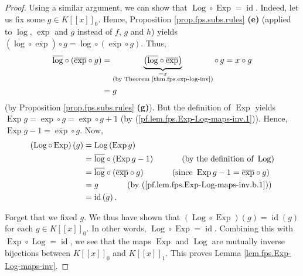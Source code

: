 \begin{proof}
Using a similar argument, we can show that $\operatorname*{Log}\circ
\operatorname*{Exp}=\operatorname*{id}$. Indeed, let us fix some $g\in
K\left[  \left[  x\right]  \right]  _{0}$. Hence, Proposition
\ref{prop.fps.subs.rules} \textbf{(e)} (applied to $\overline{\log}$,
$\overline{\exp}$ and $g$ instead of $f$, $g$ and $h$) yields $\left(
\overline{\log}\circ\overline{\exp}\right)  \circ g=\overline{\log}%
\circ\left(  \overline{\exp}\circ g\right)  $. Thus,%
\begin{align}
\overline{\log}\circ\left(  \overline{\exp}\circ g\right)   &
=\underbrace{\left(  \overline{\log}\circ\overline{\exp}\right)
}_{\substack{=x\\\text{(by Theorem \ref{thm.fps.exp-log-inv})}}}\circ
\,g=x\circ g\nonumber\\
&  =g \label{pf.lem.fps.Exp-Log-maps-inv.b.1}%
\end{align}
(by Proposition \ref{prop.fps.subs.rules} \textbf{(g)}). But the definition of
$\operatorname*{Exp}$ yields $\operatorname*{Exp}g=\exp\circ g=\overline{\exp
}\circ g+1$ (by (\ref{pf.lem.fps.Exp-Log-maps-inv.1})). Hence,
$\operatorname*{Exp}g-1=\overline{\exp}\circ g$. Now,%
\begin{align*}
\left(  \operatorname*{Log}\circ\operatorname*{Exp}\right)  \left(  g\right)
&  =\operatorname*{Log}\left(  \operatorname*{Exp}g\right) \\
&  =\overline{\log}\circ\left(  \operatorname*{Exp}g-1\right)
\ \ \ \ \ \ \ \ \ \ \left(  \text{by the definition of }\operatorname*{Log}%
\right) \\
&  =\overline{\log}\circ\left(  \overline{\exp}\circ g\right)
\ \ \ \ \ \ \ \ \ \ \left(  \text{since }\operatorname*{Exp}g-1=\overline
{\exp}\circ g\right) \\
&  =g\ \ \ \ \ \ \ \ \ \ \left(  \text{by
(\ref{pf.lem.fps.Exp-Log-maps-inv.b.1})}\right) \\
&  =\operatorname*{id}\left(  g\right)  .
\end{align*}


Forget that we fixed $g$. We thus have shown that $\left(  \operatorname*{Log}%
\circ\operatorname*{Exp}\right)  \left(  g\right)  =\operatorname*{id}\left(
g\right)  $ for each $g\in K\left[  \left[  x\right]  \right]  _{0}$. In other
words, $\operatorname*{Log}\circ\operatorname*{Exp}=\operatorname*{id}$.
Combining this with $\operatorname*{Exp}\circ\operatorname*{Log}%
=\operatorname*{id}$, we see that the maps $\operatorname*{Exp}$ and
$\operatorname*{Log}$ are mutually inverse bijections between $K\left[
\left[  x\right]  \right]  _{0}$ and $K\left[  \left[  x\right]  \right]
_{1}$. This proves Lemma \ref{lem.fps.Exp-Log-maps-inv}.
\end{proof}

